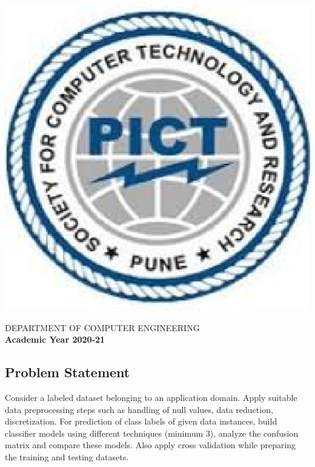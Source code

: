 \documentclass[a4paper, 12pt]{article}
\begin{document}
\begin{titlepage}
\begin{center}
        \includegraphics[scale=0.6]{pict.eps}   
        
        \Large
        DEPARTMENT OF COMPUTER ENGINEERING\\
        \textbf{Academic Year 2020-21}
        
    \end{center}
\end{titlepage}
\pagebreak

\newpage
\tableofcontents
\newpage
{}
\begin{center}
    \section{Problem Statement}
\end{center}
\par Consider a labeled dataset belonging to an application domain. Apply suitable data preprocessing steps such as handling of null values, data reduction, discretization.  For prediction of class labels of given data instances, build classifier models using different techniques (minimum 3), analyze the confusion matrix and compare these models. Also apply cross validation while preparing the training and testing datasets.
\end{document}
